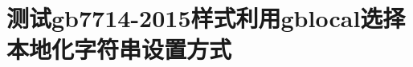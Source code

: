 \documentclass{article}
\begin{document}
\section{测试gb7714-2015样式利用gblocal选择本地化字符串设置方式}

\small

\cite{IEEEexample:frenchpatreq,吕捷2015cpi,IEEEexample:uspat,杨光2015经济波动}

\cite{Miroslav2004--,蔡敏2006--,赵学功2001--,易仕和2013--}

\cite{Peebles2001-100-100,Yi2013--}

\printbibliography[heading=subbibliography]
\end{document}
